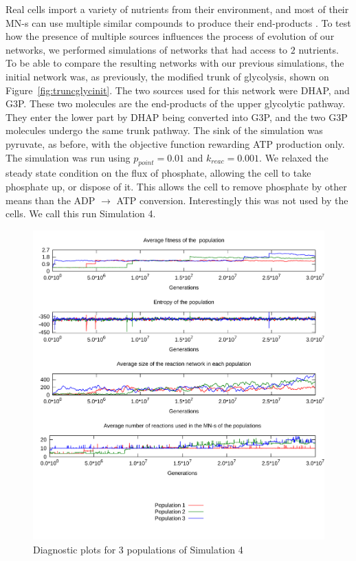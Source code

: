 \documentclass[a4paper,12pt]{article}
\begin{document}
Real cells import a variety of nutrients from their environment, and most of their \mbox{MN-s} can use multiple similar compounds to produce their end-products \cite{latent}. To test how the presence of multiple sources influences the process of evolution of our networks, we performed simulations of networks that had access to $2$ nutrients. To be able to compare the resulting networks with our previous simulations, the initial network was, as previously, the modified trunk of glycolysis, shown on Figure~\ref{fig:truncglycinit}. The two sources used for this network were DHAP, and G3P. These two molecules are the end-products of the upper glycolytic pathway. They enter the lower part by DHAP being converted into G3P, and the two G3P molecules undergo the same trunk pathway. The sink of the simulation was pyruvate, as before, with the objective function rewarding ATP production only. The simulation was run using $p_{point}=0.01$ and $k_{reac}=0.001$. We relaxed the steady state condition on the flux of phosphate, allowing the cell to take phosphate up, or dispose of it. This allows the cell to remove phosphate by other means than the ADP $\rightarrow$ ATP conversion. Interestingly this was not used by the cells. We call this run Simulation 4.

\begin{figure}[htpb]
	\centering
	\includegraphics[width=1\linewidth]{simulationmultisource.pdf}
	\caption{Diagnostic plots for 3 populations of Simulation 4}
	\label{fig:simulationmultisource}
\end{figure}
\end{document}
